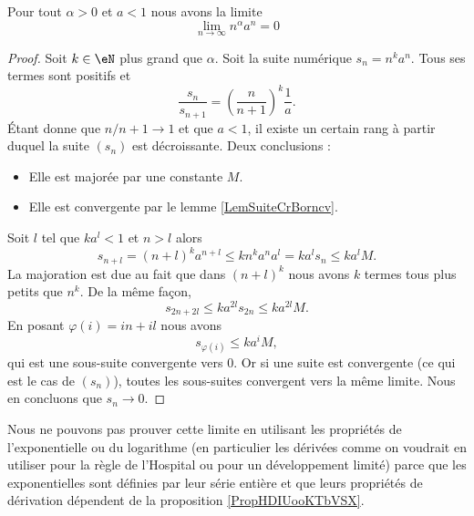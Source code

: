 \begin{lemma}       \label{LemLJOSooEiNtTs}
     Pour tout \( \alpha>0\) et \( a<1\) nous avons la limite
     \begin{equation}
         \lim_{n\to \infty} n^{\alpha}a^n=0
     \end{equation}
\end{lemma}

\begin{proof}
    Soit \( k\in \eN\) plus grand que \( \alpha\).
    Soit la suite numérique \( s_n=n^ka^n\). Tous ses termes sont positifs et
    \begin{equation}
        \frac{ s_n }{ s_{n+1} }=\left( \frac{ n }{ n+1 } \right)^k\frac{1}{ a }.
    \end{equation}
    Étant donne que \( n/n+1\to 1\) et que \( a<1\), il existe un certain rang à partir duquel la suite \( (s_n)\) est décroissante. Deux conclusions :
    \begin{itemize}
        \item Elle est majorée par une constante \( M\).
        \item Elle est convergente par le lemme \ref{LemSuiteCrBorncv}.
    \end{itemize}
    Soit \( l\) tel que \( ka^l<1\) et \( n>l\) alors
    \begin{equation}
        s_{n+l}=(n+l)^ka^{n+l}\leq kn^ka^na^l=ka^ls_n\leq ka^lM.
    \end{equation}
    La majoration est due au fait que dans \( (n+l)^k\) nous avons \( k\) termes tous plus petits que \( n^k\). De la même façon,
    \begin{equation}
        s_{2n+2l}\leq ka^{2l}s_{2n}\leq ka^{2l}M.
    \end{equation}
    En posant \( \varphi(i)=in+il\) nous avons
    \begin{equation}
        s_{\varphi(i)}\leq ka^iM,
    \end{equation}
    qui est une sous-suite convergente vers \( 0\). Or si une suite est convergente (ce qui est le cas de \( (s_n)\)), toutes les sous-suites convergent vers la même limite. Nous en concluons que \( s_n\to 0\).
\end{proof}

\begin{remark}
    Nous ne pouvons pas prouver cette limite en utilisant les propriétés de l'exponentielle ou du logarithme (en particulier les dérivées comme on voudrait en utiliser pour la règle de l'Hospital ou pour un développement limité) parce que les exponentielles sont définies par leur série entière et que leurs propriétés de dérivation dépendent de la proposition \ref{PropHDIUooKTbVSX}.
\end{remark}

